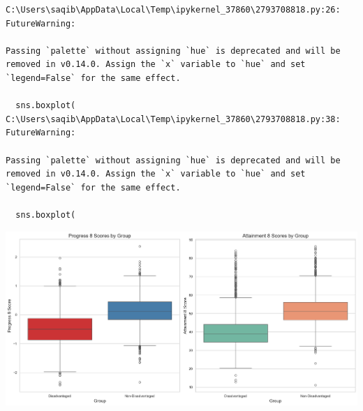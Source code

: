 \documentclass[
  letterpaper,
  DIV=11,
  numbers=noendperiod]{scrartcl}
\begin{document}
\begin{verbatim}
C:\Users\saqib\AppData\Local\Temp\ipykernel_37860\2793708818.py:26: FutureWarning: 

Passing `palette` without assigning `hue` is deprecated and will be removed in v0.14.0. Assign the `x` variable to `hue` and set `legend=False` for the same effect.

  sns.boxplot(
C:\Users\saqib\AppData\Local\Temp\ipykernel_37860\2793708818.py:38: FutureWarning: 

Passing `palette` without assigning `hue` is deprecated and will be removed in v0.14.0. Assign the `x` variable to `hue` and set `legend=False` for the same effect.

  sns.boxplot(
\end{verbatim}

\includegraphics{P4DS_A2_Data_Analysis_Project_files/figure-pdf/cell-63-output-2.png}
\end{document}
